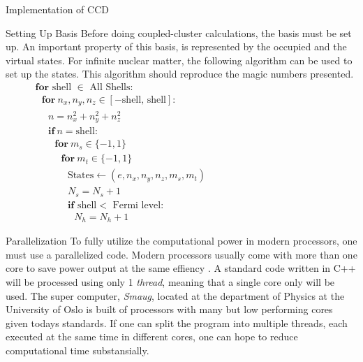 \documentclass[twoside,english]{uiofysmaster}
\begin{document}
\begin{chapter}{Implementation of CCD}
	\begin{section}{Setting Up Basis}
		Before doing coupled-cluster calculations, the basis
                must be set up. An important property of this basis,
                is represented by the occupied and the virtual states. For infinite
                nuclear matter, the following algorithm can be used to
                set up the states. This algorithm should reproduce the
                magic numbers presented.
		\begin{align*}
			&\mathbf{for } \text{ shell } \in \text{ All Shells}: \\
			&\:\:\:\mathbf{for } \: n_x, n_y, n_z \in [-\text{shell, shell} ]: \\
			&\:\:\:\:\:\:n = n_x^2 + n_y^2 + n_z^2 \\
			&\:\:\:\:\:\:\mathbf{if }\: n = \text{shell}: \\
			&\:\:\:\:\:\:\:\:\:\mathbf{for } \: m_s \in \{-1,1\} \\
			&\:\:\:\:\:\:\:\:\:\:\:\: \mathbf{for } \: m_t \in \{-1,1\} \\
			&\:\:\:\:\:\:\:\:\:\:\:\:\:\:\:\text{States} \leftarrow (e, n_x, n_y, n_z, m_s, m_t)\:\:\:\:\:\:\:\:\:\:\:\:\:\:\:\:\:\:\:\:\:\:\:\:\:\:\:\:\:\: \:\:\:\:\:\:\:\:\:\:\:\:\:\:\:\:\:\:\:\:\:\:\:\:\:\:\:\:\:\: \\
			&\:\:\:\:\:\:\:\:\:\:\:\:\:\:\:N_s = N_s + 1 \\
			&\:\:\:\:\:\:\:\:\:\:\:\:\:\:\:\mathbf{if } \text{ shell} < \text{ Fermi level}: \\
			&\:\:\:\:\:\:\:\:\:\:\:\:\:\:\:\:\:\: N_h = N_h + 1
		\end{align*}
	\end{section}

	\begin{section}{Parallelization}
		To fully utilize the computational power in modern
                processors, one must use a parallelized code. Modern
                processors usually come with more than one core to
                save power output at the same effiency
                \cite{IntelOpenMP}. A standard code written in C++ 
                will be processed using only 1 \textit{thread},
                meaning that a single core only will be used. The
                super computer, \textit{Smaug}, located at the
                department of Physics at the University of Oslo is
                built of processors with many but low performing cores
                given todays standards. If one can split the program
                into multiple threads, each executed at the same time
                in different cores, one can hope to reduce
                computational time substansially.
		

\end{section}
\end{chapter}
\end{document}

